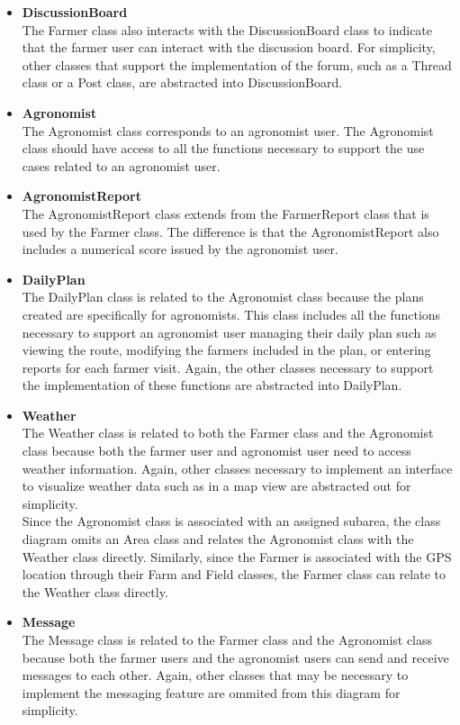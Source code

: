 \begin{flushleft}
\begin{itemize}
\item \textbf{DiscussionBoard}\\
The Farmer class also interacts with the DiscussionBoard class to indicate that the farmer user can interact with the discussion board. For simplicity, other classes that support the implementation of the forum, such as a Thread class or a Post class, are abstracted into DiscussionBoard. 

\item \textbf{Agronomist}\\
The Agronomist class corresponds to an agronomist user. The Agronomist class should have access to all the functions necessary to support the use cases related to an agronomist user. 

\item \textbf{AgronomistReport}\\
The AgronomistReport class extends from the FarmerReport class that is used by the Farmer class. The difference is that the AgronomistReport also includes a numerical score issued by the agronomist user. 

\item \textbf{DailyPlan}\\
The DailyPlan class is related to the Agronomist class because the plans created are specifically for agronomists. This class includes all the functions necessary to support an agronomist user managing their daily plan such as viewing the route, modifying the farmers included in the plan, or entering reports for each farmer visit. Again, the other classes necessary to support the implementation of these functions are abstracted into DailyPlan.

\item \textbf{Weather}\\
The Weather class is related to both the Farmer class and the Agronomist class because both the farmer user and agronomist user need to access weather information. Again, other classes necessary to implement an interface to visualize weather data such as in a map view are abstracted out for simplicity.
\smallskip\\
Since the Agronomist class is associated with an assigned subarea, the class diagram omits an Area class and relates the Agronomist class with the Weather class directly. Similarly, since the Farmer is associated with the GPS location through their Farm and Field classes, the Farmer class can relate to the Weather class directly. 

\item \textbf{Message}\\
The Message class is related to the Farmer class and the Agronomist class because both the farmer users and the agronomist users can send and receive messages to each other. Again, other classes that may be necessary to implement the messaging feature are ommited from this diagram for simplicity.


\end{itemize}
\end{flushleft}

